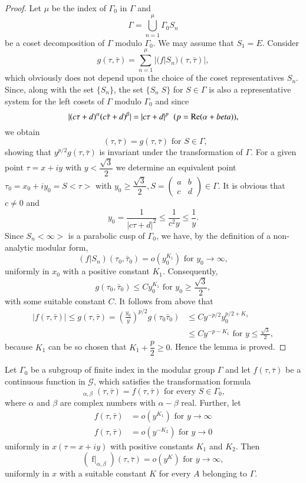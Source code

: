\begin{proof}
Let $\mu$ be the index of $\Gamma_0$ in $\Gamma$ and
$$
\Gamma = \bigcup^{\mu}_{n=1} \Gamma_0 S_n
$$
be a coset decomposition of $\Gamma$ modulo $\Gamma_0$. We may assume
that $S_1=E$. Consider 
$$
g(\tau,\bar{\tau}) =\sum^{\mu}_{n=1}|(f|S_n)(\tau,\bar{\tau})|,
$$
which obviously does not depend upon the choice of the coset
representatives $S_n$. Since, along with the set $\{S_n\}$, the set
$\{S_n \; S\}$ for $S\in \Gamma$ is also a representative system
for the left cosets of $\Gamma$ modulo $\Gamma_0$ and since 
$$
|(c\tau+d)^{\alpha} (c\bar{\tau}+d)^{\beta}| = |c\tau+d|^p \;\; 
(p=\operatorname{Re}(\alpha+beta)), 
$$
we obtain
$$
\mathop{(g|S)_{\frac{p}{2},\frac{p}{2}}} (\tau,\bar{\tau}) =
g(\tau,\bar{\tau}) \text{ for } S \in \Gamma,
$$
showing that $y^{p/2}g(\tau,\bar{\tau})$ is invariant under the
transformation of $\Gamma$. For a given point $\tau=x+iy$ with
$y<\dfrac{\surd 3}{2}$ we determine an equivalent point $\tau_0 = x_0
+ iy_0=S<\tau>$ with $y_0 \geq \dfrac{\surd 3}{2}, S =
\left(\begin{smallmatrix}
a&b\\c&d\end{smallmatrix}\right)\in \Gamma$. It is obvious 
that \pageoriginale $c\neq 0$ and
$$
y_0 = \frac{1}{|c\tau+d|^2} \leq \frac{1}{c^2y} \leq \frac{1}{y}. 
$$
Since $S_n<\infty>$ is a parabolic cusp of $\Gamma_0$, we have, by the
definition of a non-analytic modular form,
$$
(f|S_n) (\tau_0,\bar{\tau}_0) = o (y^{K_1}_0) \text{ for } y_0 \to
\infty, 
$$
uniformly in $x_0$ with a positive constant $K_1$. Consequently, 
$$
g(\tau_0,\bar{\tau}_0) \leq C y^{K_1}_0 \text{ for } y_0 \geq
\frac{\surd 3}{2},
$$
with some suitable constant $C$. It follows from above that 
\begin{align*}
|f(\tau,\bar{\tau})| \leq g(\tau,\bar{\tau}) = (\frac{y_0}{y})^{p/2}
g(\tau_0\bar{\tau}_0) & \leq C y^{-p/2} y^{p/2+K_1}_{0}\\
& \leq C y^{-p-K_1} \text{ for } y \leq \frac{\surd 3}{2}, 
\end{align*}
because $K_1$ can be so chosen that $K_1+\dfrac{p}{2} \geq 0$. Hence
the lemma is proved.
\end{proof}

\begin{lem}\label{chap5:lem11}
Let $\Gamma_0$ be a subgroup of finite index in the modular group
$\Gamma$ and let $f(\tau,\bar{\tau})$ be a continuous function in
$\mathscr{G}$, which satisfies the transformation formula
$$
\mathop{(f|S)}_{\alpha,\beta} (\tau,\bar{\tau}) = f(\tau,\bar{\tau})
\text{ for every } S\in \Gamma_0,
$$
where $\alpha$ and $\beta$ are complex numbers with $\alpha-\beta$
real. Further, let
\begin{align*}
f(\tau,\bar{\tau}) & = o(y^{K_1}) \text{ for } y \to \infty\\
f(\tau,\bar{\tau}) & = o(y^{-K_2}) \text{ for } y \to 0
\end{align*}
uniformly in $x(\tau=x+iy)$ with positive constants $K_1$ and
$K_2$. Then
$$
(\mathop{f|A^{-1}}_{\alpha,\beta}) (\tau,\bar{\tau}) = o (y^K) \text{ 
    for } y \to \infty,
$$
uniformly \pageoriginale in $x$ with a suitable constant $K$ for every
$A$ belonging to $\Gamma$.
\end{lem}

